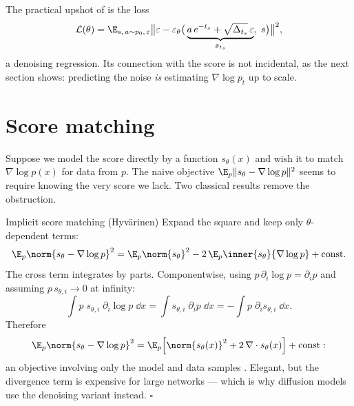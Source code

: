 The practical upshot of \citet{ho2020denoising} is the loss
\begin{equation}
  \mathcal{L}(\theta)
  = \E_{s,\, a \sim p_0,\, \varepsilon}
    \big\| \varepsilon - \varepsilon_\theta\big(
      \underbrace{a\,e^{-t_s} + \sqrt{\Delta_{t_s}}\,\varepsilon}_{x_{t_s}},\; s
    \big) \big\|^2 ,
  \label{eq:ddpm-loss}
\end{equation}
a denoising regression. Its connection with the score is not incidental, as
the next section shows: predicting the noise \emph{is} estimating
$\nabla \log p_t$ up to scale.

\section{Score matching}\label{sec:score-matching}

Suppose we model the score directly by a function $s_\theta(x)$ and wish it
to match $\nabla \log p(x)$ for data from $p$. The naive objective
$\E_p \| s_\theta - \nabla \log p \|^2$ seems to require knowing the very
score we lack. Two classical results remove the obstruction.

\begin{toolbox}{Implicit score matching (Hyv\"arinen)}
Expand the square and keep only $\theta$-dependent terms:
\begin{equation*}
  \E_p \norm{s_\theta - \nabla \log p}^2
  = \E_p \norm{s_\theta}^2
  - 2\, \E_p \inner{s_\theta}{\nabla \log p}
  + \text{const}.
\end{equation*}
The cross term integrates by parts. Componentwise, using
$p\,\partial_i \log p = \partial_i p$ and assuming $p\, s_{\theta,i} \to 0$
at infinity:
\begin{equation*}
  \int p\; s_{\theta,i}\; \partial_i \log p \;\dd x
  = \int s_{\theta,i}\; \partial_i p \;\dd x
  = - \int p\; \partial_i s_{\theta,i} \;\dd x .
\end{equation*}
Therefore
\begin{equation*}
  \E_p \norm{s_\theta - \nabla \log p}^2
  = \E_p\Big[ \norm{s_\theta(x)}^2
    + 2\, \nabla \cdot s_\theta(x) \Big] + \text{const} :
\end{equation*}
an objective involving only the model and data samples
\citep{hyvarinen2005estimation}. Elegant, but the divergence term is
expensive for large networks --- which is why diffusion models use the
denoising variant instead. \hfill$\square$
\end{toolbox}

